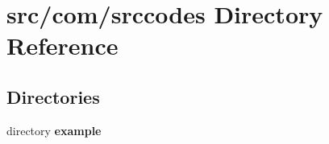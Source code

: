 \section{src/com/srccodes Directory Reference}
\label{dir_e3411be63bfcfa7ed8958f950390be85}
\subsection*{Directories}
\begin{DoxyCompactItemize}
\item 
directory {\bf example}
\end{DoxyCompactItemize}
